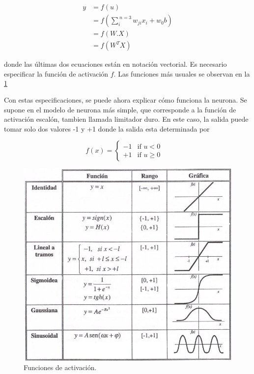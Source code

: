 \documentclass[12pt]{article}
\begin{document}
\begin{enumerate}
\begin{equation} \label{eq1}
\begin{split}
y 	&= f(u)\\
	&= f(\sum_{i}^{\ n=3} w_{ji}x_i + w_0b)\\
	&= f(W.X)\\
	&= f(W^TX)
\end{split}
\end{equation}

donde las últimas dos ecuaciones están en notación vectorial.
Es necesario especificar la función de activación $f$. Las funciones más usuales se observan en la  \ref{fig:FUNCACT}

Con estas especificaciones, se puede ahora explicar cómo funciona la neurona. Se supone en el modelo de neurona más simple, que corresponde a la función de activación escalón, tambien llamada limitador duro. En este caso, la salida puede tomar solo dos valores -1 y +1 donde la salida esta determinada por

\begin{equation}\label{eq2}
f(x) = \begin{cases}
             -1  & \text{if } u < 0 \\
             +1  & \text{if } u \ge 0
       \end{cases} \quad
\end{equation}

\clearpage

\begin{figure}[h]
\includegraphics[width=\textwidth]{list_function}
\centering
\caption{Funciones de activación.}
\label{fig:FUNCACT}
\end{figure}


\end{enumerate}
\end{document}
